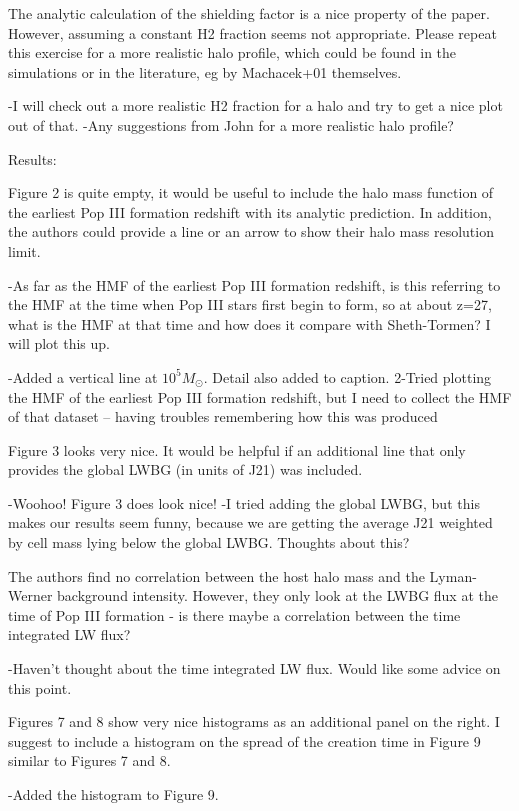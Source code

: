 \documentclass[11pt]{article}
\newenvironment{referee}[1][]{%
    \ignorespaces%
    \begin{mdframed}[style=myquotestyle,#1]%
}{%
    \end{mdframed}%
    \ignorespacesafterend%
}%
\begin{document}
\begin{referee}
The analytic calculation of the shielding factor is a nice property of the paper. However, assuming a constant H2 fraction seems not appropriate. Please repeat this exercise for a more realistic halo profile, which could be found in the simulations or in the literature, eg by Machacek+01 themselves.
\end{referee}
-I will check out a more realistic H2 fraction for a halo and try to get a nice plot out of that.
-Any suggestions from John for a more realistic halo profile?

\begin{referee}
Results:

Figure 2 is quite empty, it would be useful to include the halo mass function of the earliest Pop III formation redshift with its analytic prediction. In addition, the authors could provide a line or an arrow to show their halo mass resolution limit.
\end{referee}
-As far as the HMF of the earliest Pop III formation redshift, is this referring to the HMF at the time when Pop III stars first begin to form, so at about z=27, what is the HMF at that time and how does it compare with Sheth-Tormen? I will plot this up.

-Added a vertical line at $10^5 M_{\odot}$. Detail also added to caption.
2-Tried plotting the HMF of the earliest Pop III formation redshift, but I need to collect the HMF of that dataset -- having troubles remembering how this was produced 


\begin{referee}
Figure 3 looks very nice. It would be helpful if an additional line that only 
provides the global LWBG (in units of J21) was included.
\end{referee}
-Woohoo! Figure 3 does look nice!
-I tried adding the global LWBG, but this makes our results seem funny, because we are getting the average J21 weighted by cell mass lying below the global LWBG. Thoughts about this?

\begin{referee}
The authors find no correlation between the host halo mass and the Lyman-Werner background intensity. However, they only look at the LWBG flux at the time of Pop III formation - is there maybe a correlation between the time integrated LW flux?
\end{referee}
-Haven't thought about the time integrated LW flux. Would like some advice on this point. 

\begin{referee}
Figures 7 and 8 show very nice histograms as an additional panel on the right.  I suggest to include a histogram on the spread of the creation time in Figure 9 similar to Figures 7 and 8.
\end{referee}
-Added the histogram to Figure 9. 
\end{document}
